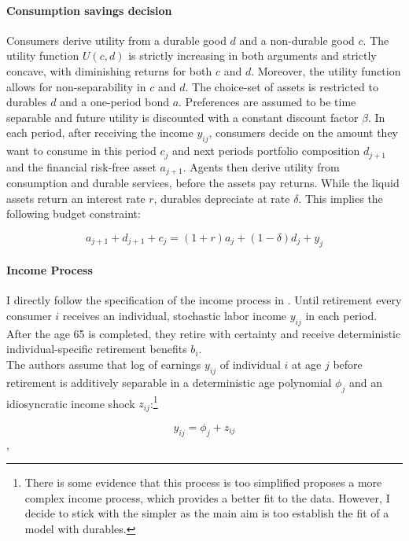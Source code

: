 \documentclass[a4paper,12pt,legno]{article}
\begin{document}
\paragraph{Consumption savings decision}
Consumers derive utility from a durable good $d$ and a non-durable good $c$. The utility function $U(c,d)$ is strictly increasing in both arguments and strictly concave, with diminishing returns for both $c$ and $d$. Moreover, the utility function allows for non-separability in $c$ and $d$. The choice-set of assets is restricted to durables $d$ and a one-period bond $a$. Preferences are assumed to be time separable and future utility is discounted with a constant discount factor $\beta$.
In each period, after receiving the income $y_{ij}$, consumers decide on the amount they want to consume in this period $c_{j}$ and next periods portfolio composition $d_{j+1}$ and the financial risk-free asset $a_{j+1}$. Agents then derive utility from consumption and durable services, before the assets pay returns. While the liquid assets return an interest rate $r$, durables depreciate at rate $\delta$. This implies the following budget constraint:  

\begin{equation}
a_{j+1}+d_{j+1}+c_{j}=(1+r)a_{j} + (1-\delta)d_{j}+y_{j}
\end{equation}

\paragraph{Income Process}
I directly follow the specification of the income process in \cite{hintermaier2011}. Until retirement every consumer $i$ receives an individual, stochastic labor income $y_{ij}$ in each period. After the age 65 is completed, they retire with certainty and receive deterministic individual-specific retirement benefits $b_{i}$. \\
The authors assume that log of earnings $y_{ij}$ of individual $i$ at age $j$ before retirement is additively separable in a deterministic age polynomial $\phi_{j}$ and an idiosyncratic income shock $z_{ij}$:\footnote{There is some evidence that this process is too simplified \cite{guvenen2015data} proposes a more complex income process, which provides a better fit to the data. However, I decide to stick with the simpler as the main aim is too establish the fit of a model with durables.} 

\begin{equation}\label{eq:income_process}
y_{ij}=\phi_{j}+z_{ij}
\end{equation},
\end{document}
